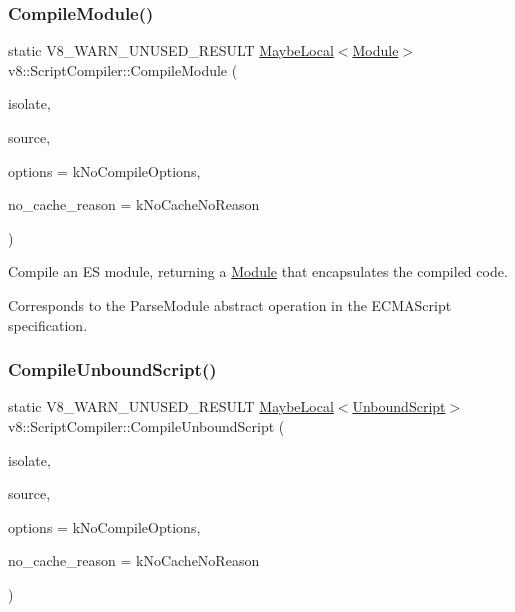 \subsubsection{\texorpdfstring{Compile\+Module()}{CompileModule()}}
{\footnotesize\ttfamily static V8\+\_\+\+W\+A\+R\+N\+\_\+\+U\+N\+U\+S\+E\+D\+\_\+\+R\+E\+S\+U\+LT \mbox{\hyperlink{classv8_1_1MaybeLocal}{Maybe\+Local}}$<$\mbox{\hyperlink{classv8_1_1Module}{Module}}$>$ v8\+::\+Script\+Compiler\+::\+Compile\+Module (\begin{DoxyParamCaption}\item[{Isolate $\ast$}]{isolate,  }\item[{\mbox{\hyperlink{classv8_1_1ScriptCompiler_1_1Source}{Source}} $\ast$}]{source,  }\item[{Compile\+Options}]{options = {\ttfamily kNoCompileOptions},  }\item[{\mbox{\hyperlink{classv8_1_1ScriptCompiler_a7f13fa15484cfc500ae51927756e0d60}{No\+Cache\+Reason}}}]{no\+\_\+cache\+\_\+reason = {\ttfamily kNoCacheNoReason} }\end{DoxyParamCaption})\hspace{0.3cm}{\ttfamily [static]}}

Compile an ES module, returning a \mbox{\hyperlink{classv8_1_1Module}{Module}} that encapsulates the compiled code.

Corresponds to the Parse\+Module abstract operation in the E\+C\+M\+A\+Script specification. \mbox{\label{classv8_1_1ScriptCompiler_a4054a9857df7f2e6a8747f23108776e7}} 
\subsubsection{\texorpdfstring{Compile\+Unbound\+Script()}{CompileUnboundScript()}}
{\footnotesize\ttfamily static V8\+\_\+\+W\+A\+R\+N\+\_\+\+U\+N\+U\+S\+E\+D\+\_\+\+R\+E\+S\+U\+LT \mbox{\hyperlink{classv8_1_1MaybeLocal}{Maybe\+Local}}$<$\mbox{\hyperlink{classv8_1_1UnboundScript}{Unbound\+Script}}$>$ v8\+::\+Script\+Compiler\+::\+Compile\+Unbound\+Script (\begin{DoxyParamCaption}\item[{Isolate $\ast$}]{isolate,  }\item[{\mbox{\hyperlink{classv8_1_1ScriptCompiler_1_1Source}{Source}} $\ast$}]{source,  }\item[{Compile\+Options}]{options = {\ttfamily kNoCompileOptions},  }\item[{\mbox{\hyperlink{classv8_1_1ScriptCompiler_a7f13fa15484cfc500ae51927756e0d60}{No\+Cache\+Reason}}}]{no\+\_\+cache\+\_\+reason = {\ttfamily kNoCacheNoReason} }\end{DoxyParamCaption})\hspace{0.3cm}{\ttfamily [static]}}


